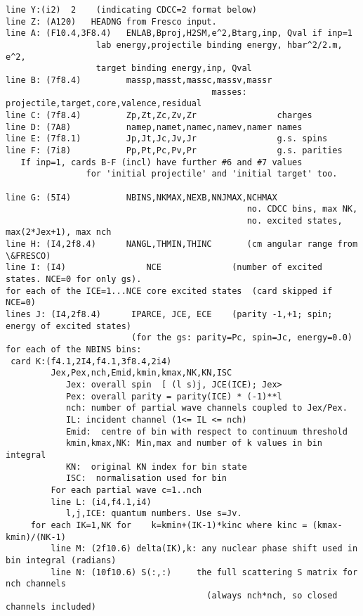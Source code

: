 \documentclass[11pt]{article}
\begin{document}
\begin{description}
{\footnotesize
\begin{verbatim}
line Y:(i2)  2    (indicating CDCC=2 format below)
line Z: (A120)   HEADNG from Fresco input.
line A: (F10.4,3F8.4)   ENLAB,Bproj,H2SM,e^2,Btarg,inp, Qval if inp=1
                  lab energy,projectile binding energy, hbar^2/2.m, e^2, 
                  target binding energy,inp, Qval 
line B: (7f8.4)         massp,masst,massc,massv,massr  
                                         masses: projectile,target,core,valence,residual
line C: (7f8.4)         Zp,Zt,Zc,Zv,Zr                charges
line D: (7A8)           namep,namet,namec,namev,namer names
line E: (7f8.1)         Jp,Jt,Jc,Jv,Jr                g.s. spins
line F: (7i8)           Pp,Pt,Pc,Pv,Pr                g.s. parities
   If inp=1, cards B-F (incl) have further #6 and #7 values 
                for 'initial projectile' and 'initial target' too.

line G: (5I4)           NBINS,NKMAX,NEXB,NNJMAX,NCHMAX
                                                no. CDCC bins, max NK,
                                                no. excited states, max(2*Jex+1), max nch
line H: (I4,2f8.4)      NANGL,THMIN,THINC       (cm angular range from \&FRESCO)
line I: (I4)                NCE              (number of excited states. NCE=0 for only gs).
for each of the ICE=1...NCE core excited states  (card skipped if NCE=0)
lines J: (I4,2f8.4)      IPARCE, JCE, ECE    (parity -1,+1; spin; energy of excited states)
                         (for the gs: parity=Pc, spin=Jc, energy=0.0)
for each of the NBINS bins:
 card K:(f4.1,2I4,f4.1,3f8.4,2i4)
         Jex,Pex,nch,Emid,kmin,kmax,NK,KN,ISC
            Jex: overall spin  [ (l s)j, JCE(ICE); Jex>
            Pex: overall parity = parity(ICE) * (-1)**l
            nch: number of partial wave channels coupled to Jex/Pex.
            IL: incident channel (1<= IL <= nch)
            Emid:  centre of bin with respect to continuum threshold
            kmin,kmax,NK: Min,max and number of k values in bin integral
            KN:  original KN index for bin state
            ISC:  normalisation used for bin
         For each partial wave c=1..nch
         line L: (i4,f4.1,i4)
            l,j,ICE: quantum numbers. Use s=Jv.            
     for each IK=1,NK for    k=kmin+(IK-1)*kinc where kinc = (kmax-kmin)/(NK-1)
         line M: (2f10.6) delta(IK),k: any nuclear phase shift used in bin integral (radians)
         line N: (10f10.6) S(:,:)     the full scattering S matrix for nch channels 
                                        (always nch*nch, so closed channels included)


\end{verbatim}}
\end{description}
\end{document}
